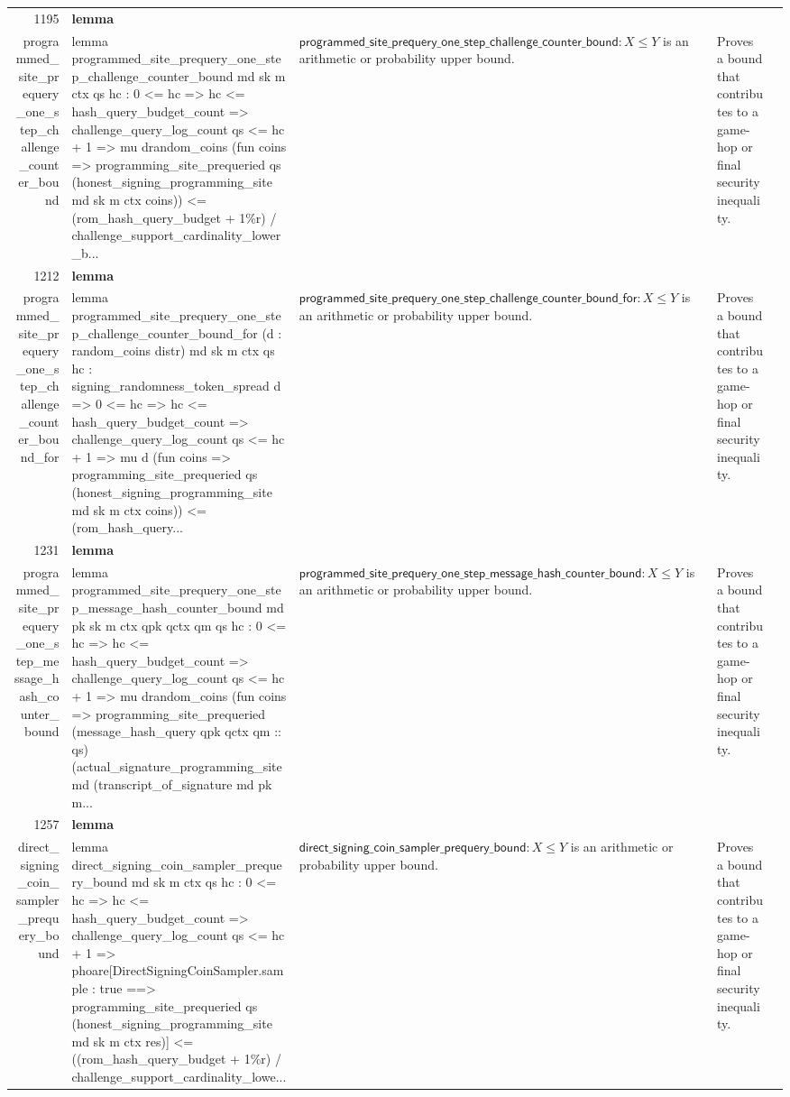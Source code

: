 \documentclass[10pt]{article}
\newcommand{\ec}[1]{\begingroup\ttfamily\scriptsize #1\endgroup}
\begin{document}
\begin{longtable}{r L{0.17\textwidth} L{0.26\textwidth} L{0.27\textwidth} L{0.20\textwidth}}
1195 & \textbf{lemma}\\\ec{programmed\_site\_prequery\_one\_step\_challenge\_counter\_bound} & \ec{lemma programmed\_site\_prequery\_one\_step\_challenge\_counter\_bound md sk m ctx qs hc : 0 <= hc => hc <= hash\_query\_budget\_count => challenge\_query\_log\_count qs <= hc + 1 => mu drandom\_coins (fun coins => programming\_site\_prequeried qs (honest\_signing\_programming\_site md sk m ctx coins)) <= (rom\_hash\_query\_budget + 1\%r) / challenge\_support\_cardinality\_lower\_b...} & \(\mathsf{programmed\_site\_prequery\_one\_step\_challenge\_counter\_bound} : X \le Y\) is an arithmetic or probability upper bound. & Proves a bound that contributes to a game-hop or final security inequality. \\
1212 & \textbf{lemma}\\\ec{programmed\_site\_prequery\_one\_step\_challenge\_counter\_bound\_for} & \ec{lemma programmed\_site\_prequery\_one\_step\_challenge\_counter\_bound\_for (d : random\_coins distr) md sk m ctx qs hc : signing\_randomness\_token\_spread d => 0 <= hc => hc <= hash\_query\_budget\_count => challenge\_query\_log\_count qs <= hc + 1 => mu d (fun coins => programming\_site\_prequeried qs (honest\_signing\_programming\_site md sk m ctx coins)) <= (rom\_hash\_query...} & \(\mathsf{programmed\_site\_prequery\_one\_step\_challenge\_counter\_bound\_for} : X \le Y\) is an arithmetic or probability upper bound. & Proves a bound that contributes to a game-hop or final security inequality. \\
1231 & \textbf{lemma}\\\ec{programmed\_site\_prequery\_one\_step\_message\_hash\_counter\_bound} & \ec{lemma programmed\_site\_prequery\_one\_step\_message\_hash\_counter\_bound md pk sk m ctx qpk qctx qm qs hc : 0 <= hc => hc <= hash\_query\_budget\_count => challenge\_query\_log\_count qs <= hc + 1 => mu drandom\_coins (fun coins => programming\_site\_prequeried (message\_hash\_query qpk qctx qm :: qs) (actual\_signature\_programming\_site md (transcript\_of\_signature md pk m...} & \(\mathsf{programmed\_site\_prequery\_one\_step\_message\_hash\_counter\_bound} : X \le Y\) is an arithmetic or probability upper bound. & Proves a bound that contributes to a game-hop or final security inequality. \\
1257 & \textbf{lemma}\\\ec{direct\_signing\_coin\_sampler\_prequery\_bound} & \ec{lemma direct\_signing\_coin\_sampler\_prequery\_bound md sk m ctx qs hc : 0 <= hc => hc <= hash\_query\_budget\_count => challenge\_query\_log\_count qs <= hc + 1 => phoare[DirectSigningCoinSampler.sample : true ==> programming\_site\_prequeried qs (honest\_signing\_programming\_site md sk m ctx res)] <= ((rom\_hash\_query\_budget + 1\%r) / challenge\_support\_cardinality\_lowe...} & \(\mathsf{direct\_signing\_coin\_sampler\_prequery\_bound} : X \le Y\) is an arithmetic or probability upper bound. & Proves a bound that contributes to a game-hop or final security inequality. \\

\end{longtable}
\end{document}
